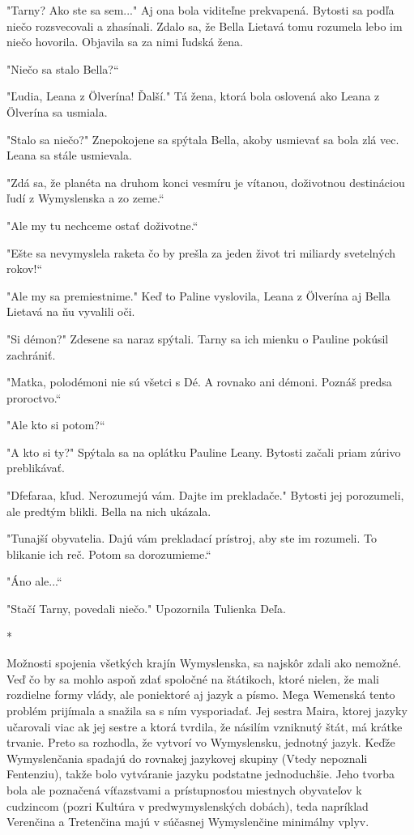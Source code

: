 \documentclass{book}
\begin{document}
"$ $Tarny? Ako ste sa sem..."$ $ Aj ona bola viditeľne prekvapená. Bytosti sa podľa niečo rozsvecovali a zhasínali. Zdalo sa, že Bella Lietavá tomu rozumela lebo im niečo hovorila. Objavila sa za nimi ľudská žena.

"$ $Niečo sa stalo Bella?“

"$ $Ľudia, Leana z Ölverína! Ďalší."$ $ Tá žena, ktorá bola oslovená ako Leana z Ölverína sa usmiala.

"$ $Stalo sa niečo?"$ $ Znepokojene sa spýtala Bella, akoby usmievať sa bola zlá vec. Leana sa stále usmievala.

"$ $Zdá sa, že planéta na druhom konci vesmíru je vítanou, doživotnou destináciou ľudí z Wymyslenska a zo zeme.“

"$ $Ale my tu nechceme ostať doživotne.“

"$ $Ešte sa nevymyslela raketa čo by prešla za jeden život tri miliardy svetelných rokov!“

"$ $Ale my sa premiestnime."$ $ Keď to Paline vyslovila, Leana z Ölverína aj Bella Lietavá na ňu vyvalili oči.

"$ $Si démon?"$ $ Zdesene sa naraz spýtali. Tarny sa ich mienku o Pauline pokúsil zachrániť.

"$ $Matka, polodémoni nie sú všetci s Dé. A rovnako ani démoni. Poznáš predsa proroctvo.“

"$ $Ale kto si potom?“

"$ $A kto si ty?"$ $ Spýtala sa na oplátku Pauline Leany. Bytosti začali priam zúrivo preblikávať.

"$ $Dfefaraa, kľud. Nerozumejú vám. Dajte im prekladače."$ $ Bytosti jej porozumeli, ale predtým blikli. Bella na nich ukázala.

"$ $Tunajší obyvatelia. Dajú vám prekladací prístroj, aby ste im rozumeli. To blikanie ich reč. Potom sa dorozumieme.“

"$ $Áno ale...“

"$ $Stačí Tarny, povedali niečo."$ $ Upozornila Tulienka Deľa.

\begin{center}
*
\end{center}

Možnosti spojenia všetkých krajín Wymyslenska, sa najskôr zdali ako nemožné. Veď čo by sa mohlo aspoň zdať spoločné na štátikoch, ktoré nielen, že mali rozdielne formy vlády, ale poniektoré aj jazyk a písmo. Mega Wemenská tento problém prijímala a snažila sa s ním vysporiadať. Jej sestra Maira, ktorej jazyky učarovali viac ak jej sestre a ktorá tvrdila, že násilím vzniknutý štát, má krátke trvanie. Preto sa rozhodla, že vytvorí vo Wymyslensku, jednotný jazyk. Keďže Wymyslenčania spadajú do rovnakej jazykovej skupiny (Vtedy nepoznali Fentenziu), takže bolo vytváranie jazyku podstatne jednoduchšie. Jeho tvorba bola ale poznačená víťazstvami a prístupnosťou miestnych obyvateľov k cudzincom (pozri Kultúra v predwymyslenských dobách), teda napríklad Verenčina a Tretenčina majú v súčasnej Wymyslenčine minimálny vplyv.
\end{document}
